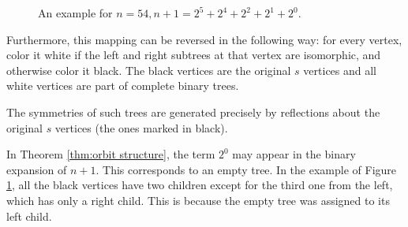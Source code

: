 \begin{figure}[h!]
\caption{An example for $n=54, n+1=2^5+2^4+2^2+2^1+2^0$.}
\label{fig:minorbit}
\end{figure}
Furthermore, this mapping can be reversed in the following way: for every vertex, color it white if the left and right subtrees at that vertex are isomorphic, and otherwise color it black. The black vertices are the original $s$ vertices and all white vertices are part of complete binary trees.

The symmetries of such trees are generated precisely by reflections about the original $s$ vertices (the ones marked in black).

\begin{remark}
In Theorem \ref{thm:orbit structure}, the term $2^0$ may appear in the binary expansion of $n+1$. This corresponds to an empty tree. In the example of Figure \ref{fig:minorbit}, all the black vertices have two children except for the third one from the left, which has only a right child. This is because the empty tree was assigned to its left child.
\end{remark}